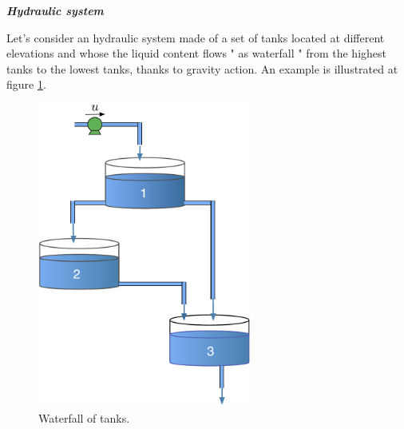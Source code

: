 \begin{exemple}\label{systhyd}{\bf \em Hydraulic system}

Let's consider an hydraulic system made of a set of 
tanks located at different elevations and whose the liquid content  
flows " as waterfall " from the highest tanks to the lowest tanks, 
thanks to gravity action. An example is illustrated at figure \ref{Fig:cascade}.

\begin{figure}[h] 
\begin{center}
\includegraphics[width=7cm]{cascade}
\caption{Waterfall of tanks.}
\label{Fig:cascade}
\end{center} 
\end{figure}


\end{exemple}
